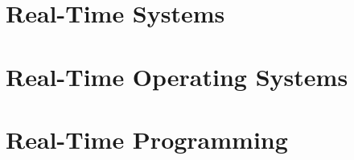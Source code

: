 \chapter{Real-Time Systems}


\chapter{Real-Time Operating Systems}


\chapter{Real-Time Programming}


%

%

%

%

%

